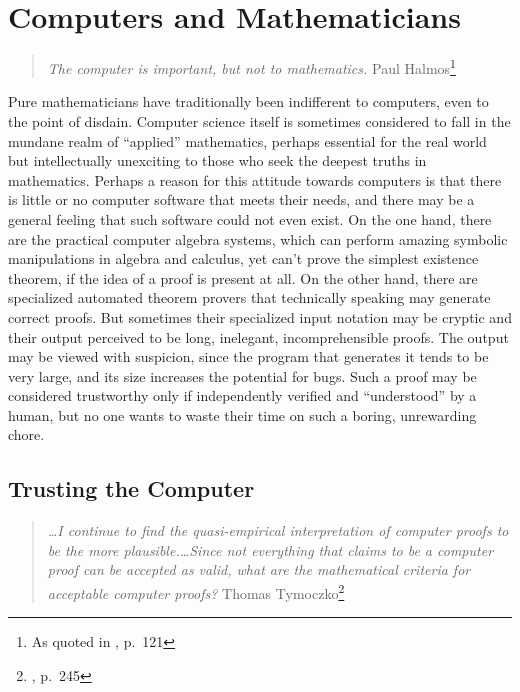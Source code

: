 \section{Computers and Mathematicians}

\begin{quote}
  {\em The computer is important, but not to mathematics.}
    \flushright\sc  Paul Halmos\footnote{As quoted in \cite{Albers}, p.~121}\\
\end{quote}

Pure mathematicians have traditionally been indifferent to computers, even to
the point of disdain.  Computer science
itself is sometimes considered to fall in the mundane realm of ``applied''
mathematics, perhaps essential for the real world but intellectually unexciting
to those who seek the deepest truths in mathematics.  Perhaps a reason for this
attitude towards computers is that there is little or no computer software that
meets their needs, and there may be a general feeling that such software could
not even exist.  On the one hand, there are the practical computer algebra
systems, which can perform amazing symbolic manipulations in algebra and
calculus, yet can't prove the simplest
existence theorem, if the idea of a proof is present at all.  On the other
hand, there are specialized automated theorem provers that technically speaking
may generate correct proofs.  But sometimes
their specialized input notation may be cryptic and their output perceived to
be long, inelegant, incomprehensible proofs.    The output
may be viewed with suspicion, since the program that generates it tends to be
very large, and its size increases the potential for bugs.  Such a proof may be considered trustworthy only if
independently verified and ``understood'' by a human, but no one wants to
waste their time on such a boring, unrewarding chore.



\subsection{Trusting the Computer}

\begin{quote}
  {\em \ldots I continue to find the quasi-empirical interpretation of
  computer proofs to be the more plausible.\ldots Since not
  everything that claims to be a computer proof can be
  accepted as valid, what are the mathematical criteria for acceptable
  computer proofs?}
    \flushright\sc  Thomas Tymoczko\footnote{\cite{Tymoczko}, p.~245}\\
\end{quote}

